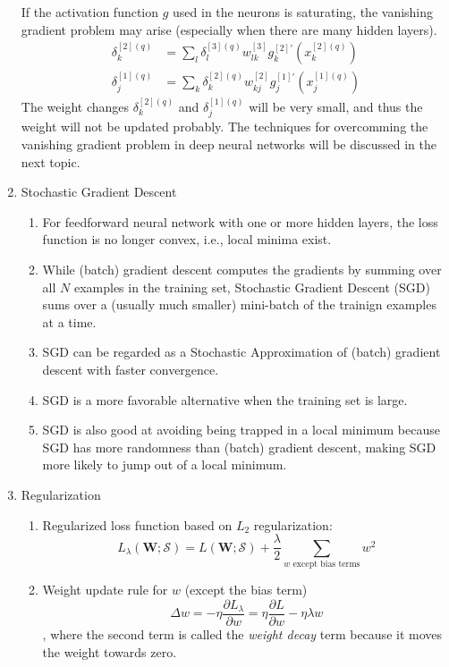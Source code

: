 \documentclass[11pt]{article}
\newcommand\pddx[2]{\frac{\partial{#1}}{\partial{#2}}}
\begin{document}
\begin{enumerate}
If the activation function $g$ used in the neurons is saturating, the vanishing gradient problem may arise (especially when there are many hidden layers).
\begin{align*}
    \delta^{[2](q)}_k &= \sum_{l} \delta^{[3](q)}_{l} w^{[3]}_{lk} g^{[2]'}_{k} (x^{[2](q)}_{k})\\
    \delta^{[1](q)}_j &= \sum_{k} \delta^{[2](q)}_{k} w^{[2]}_{kj} g^{[1]'}_{j} (x^{[1](q)}_{j})
\end{align*}
The weight changes $\delta^{[2](q)}_k$ and $\delta^{[1](q)}_j$ will be very small, and thus the weight will not be updated probably. The techniques for overcomming the vanishing gradient problem in deep neural networks will be discussed in the next topic.

\item Stochastic Gradient Descent
\begin{enumerate}
    \item For feedforward neural network with one or more hidden layers, the loss function is no longer convex, i.e., local minima exist.
    \item While (batch) gradient descent computes the gradients by summing over all $N$ examples in the training set, Stochastic Gradient Descent (SGD) sums over a (usually much smaller) mini-batch of the trainign examples at a time.
    \item SGD can be regarded as a Stochastic Approximation of (batch) gradient descent with faster convergence.
    \item SGD is a more favorable alternative when the training set is large.
    \item SGD is also good at avoiding being trapped in a local minimum because SGD has more randomness than (batch) gradient descent, making SGD more likely to jump out of a local minimum.
\end{enumerate}

\item Regularization
\begin{enumerate}
    \item Regularized loss function based on $L_2$ regularization: $$L_{\lambda}(\mathbf{W}; \mathcal{S}) = L(\mathbf{W}; \mathcal{S}) + \frac{\lambda}{2} \sum_{w\text{ except bias terms}} w^2$$
    \item Weight update rule for $w$ (except the bias term) $$\Delta w = - \eta \pddx{L_{\lambda}}{w} = \eta \pddx{L}{w} - \eta \lambda w$$, where the second term is called the \emph{weight decay} term because it moves the weight towards zero.
\end{enumerate}


\end{enumerate}
\end{document}
